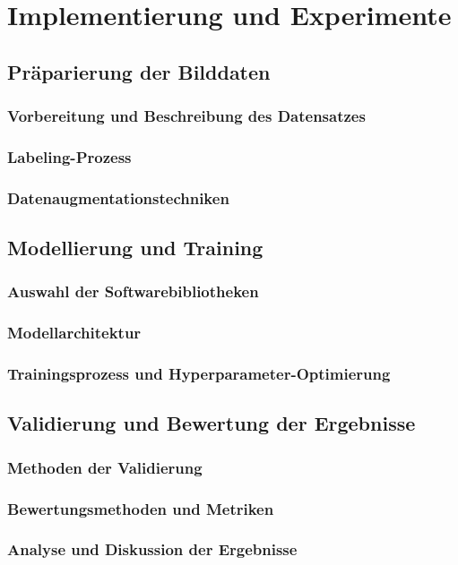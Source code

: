 \chapter{Implementierung und Experimente}\label{sec:model_implement}

\section{Präparierung der Bilddaten}
\subsection{Vorbereitung und Beschreibung des Datensatzes}
\subsection{Labeling-Prozess}
\subsection{Datenaugmentationstechniken}

\section{Modellierung und Training}
\subsection{Auswahl der Softwarebibliotheken} 
\subsection{Modellarchitektur}
\subsection{Trainingsprozess und Hyperparameter-Optimierung}
\section{Validierung und Bewertung der Ergebnisse}
\subsection{Methoden der Validierung}
\subsection{Bewertungsmethoden und Metriken}
\subsection{Analyse und Diskussion der Ergebnisse}
